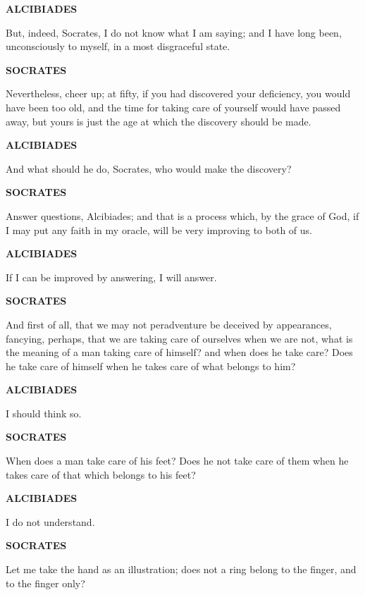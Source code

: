 \documentclass[11pt,letter]{article}
\begin{document}
\par \textbf{ALCIBIADES}
\par   But, indeed, Socrates, I do not know what I am saying; and I have long been, unconsciously to myself, in a most disgraceful state.

\par \textbf{SOCRATES}
\par   Nevertheless, cheer up; at fifty, if you had discovered your deficiency, you would have been too old, and the time for taking care of yourself would have passed away, but yours is just the age at which the discovery should be made.

\par \textbf{ALCIBIADES}
\par   And what should he do, Socrates, who would make the discovery?

\par \textbf{SOCRATES}
\par   Answer questions, Alcibiades; and that is a process which, by the grace of God, if I may put any faith in my oracle, will be very improving to both of us.

\par \textbf{ALCIBIADES}
\par   If I can be improved by answering, I will answer.

\par \textbf{SOCRATES}
\par   And first of all, that we may not peradventure be deceived by appearances, fancying, perhaps, that we are taking care of ourselves when we are not, what is the meaning of a man taking care of himself? and when does he take care? Does he take care of himself when he takes care of what belongs to him?

\par \textbf{ALCIBIADES}
\par   I should think so.

\par \textbf{SOCRATES}
\par   When does a man take care of his feet? Does he not take care of them when he takes care of that which belongs to his feet?

\par \textbf{ALCIBIADES}
\par   I do not understand.

\par \textbf{SOCRATES}
\par   Let me take the hand as an illustration; does not a ring belong to the finger, and to the finger only?
\end{document}
